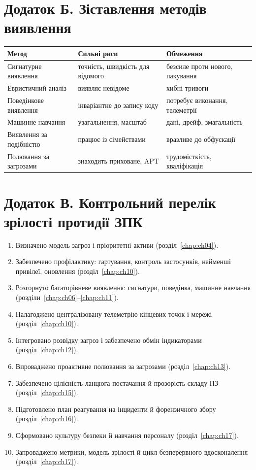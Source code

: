 \section*{Додаток Б. Зіставлення методів виявлення}

\begin{center}\footnotesize
\begin{tabularx}{\linewidth}{L{26mm} Y Y}
\toprule
Метод & Сильні риси & Обмеження \\
\midrule
Сигнатурне виявлення & точність, швидкість для відомого & безсиле проти нового, пакування \\
Евристичний аналіз & виявляє невідоме & хибні тривоги \\
Поведінкове виявлення & інваріантне до запису коду & потребує виконання, телеметрії \\
Машинне навчання & узагальнення, масштаб & дані, дрейф, змагальність \\
Виявлення за подібністю & працює із сімействами & вразливе до обфускації \\
Полювання за загрозами & знаходить приховане, APT & трудомісткість, кваліфікація \\
\bottomrule
\end{tabularx}
\end{center}

\section*{Додаток В. Контрольний перелік зрілості протидії ЗПК}

\begin{enumerate}[leftmargin=6mm,itemsep=2pt]
\item Визначено модель загроз і пріоритетні активи (розділ~\ref{chap:ch04}).
\item Забезпечено профілактику: гартування, контроль застосунків, найменші привілеї, оновлення (розділ~\ref{chap:ch10}).
\item Розгорнуто багаторівневе виявлення: сигнатури, поведінка, машинне навчання (розділи~\ref{chap:ch06}--\ref{chap:ch11}).
\item Налагоджено централізовану телеметрію кінцевих точок і мережі (розділ~\ref{chap:ch10}).
\item Інтегровано розвідку загроз і забезпечено обмін індикаторами (розділ~\ref{chap:ch12}).
\item Впроваджено проактивне полювання за загрозами (розділ~\ref{chap:ch13}).
\item Забезпечено цілісність ланцюга постачання й прозорість складу ПЗ (розділ~\ref{chap:ch15}).
\item Підготовлено план реагування на інциденти й форензичного збору (розділ~\ref{chap:ch16}).
\item Сформовано культуру безпеки й навчання персоналу (розділ~\ref{chap:ch17}).
\item Запроваджено метрики, модель зрілості й цикл безперервного вдосконалення (розділ~\ref{chap:ch17}).
\end{enumerate}
